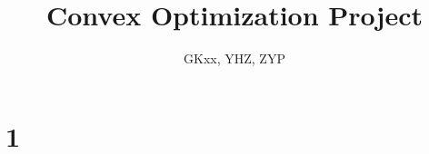 \documentclass[11pt]{article}
\title{Convex Optimization Project}
\author{GKxx, YHZ, ZYP}
\begin{document}
\maketitle

\tableofcontents

\section{1}
\end{document}
